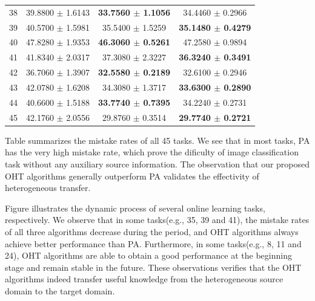 \documentclass[twocolumn]{article}
\begin{document}
\begin{table}[!htb]
\begin{tabular}{|c||c|c|c|}
38 & 39.8800 $\pm$ 1.6143 & \textbf{33.7560 $\pm$ 1.1056} & 34.4460 $\pm$ 0.2966\\
39 & 40.5700 $\pm$ 1.5981 & 35.5400 $\pm$ 1.5259 & \textbf{35.1480 $\pm$ 0.4279}\\
40 & 47.8280 $\pm$ 1.9353 & \textbf{46.3060 $\pm$ 0.5261} & 47.2580 $\pm$ 0.9894\\
41 & 41.8340 $\pm$ 2.0317 & 37.3080 $\pm$ 2.3227 & \textbf{36.3240 $\pm$ 0.3491}\\
42 & 36.7060 $\pm$ 1.3907 & \textbf{32.5580 $\pm$ 0.2189} & 32.6100 $\pm$ 0.2946\\
43 & 42.0780 $\pm$ 1.6208 & 34.3080 $\pm$ 1.3717 & \textbf{33.6300 $\pm$ 0.2890}\\
44 & 40.6600 $\pm$ 1.5188 & \textbf{33.7740 $\pm$ 0.7395} & 34.2240 $\pm$ 0.2731\\
45 & 42.1760 $\pm$ 2.0556 & 29.8760 $\pm$ 0.3514 & \textbf{29.7740 $\pm$ 0.2721}\\
\hline\hline
\end{tabular}
\label{results}
\end{table}

Table summarizes the mistake rates of all 45 tasks.
We see that in most tasks, PA has the very high mistake rate, which prove the dificulty of image classification task without any auxiliary source information.
The observation that our proposed OHT algorithms generally outperform PA validates the effectivity of heterogeneous transfer.

Figure illustrates the dynamic process of several online learning tasks, respectively.
We observe that in some tasks(e.g., 35, 39 and 41), the mistake rates of all three algorithms decrease during the period, and OHT algorithms always achieve better performance than PA.
Furthermore, in some tasks(e.g., 8, 11 and 24), OHT algorithms are able to obtain a good performance at the beginning stage and remain stable in the future.
These observations verifies that the OHT algorithms indeed transfer useful knowledge from the heterogeneous source domain to the target domain. 
\end{document}
